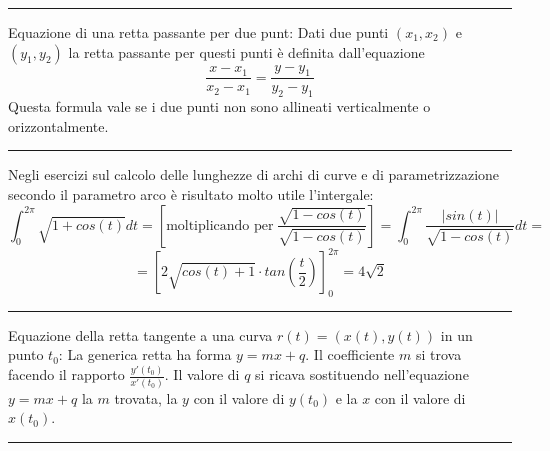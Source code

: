 \rule{\textwidth}{0,4pt}
Equazione di una retta passante per due punt:\newline
Dati due punti $(x_1, x_2)$ e $(y_1, y_2)$ la retta passante per questi punti è definita dall'equazione
\[
    \frac{x-x_1}{x_2-x_1} = \frac{y-y_1}{y_2-y_1}
\]
Questa formula vale se i due punti non sono allineati verticalmente o orizzontalmente.\newline
\rule{\textwidth}{0,4pt}\newline
Negli esercizi sul calcolo delle lunghezze di archi di curve e di parametrizzazione secondo il parametro arco è risultato molto utile l'intergale:
\[
    \int_{0}^{2\pi} \sqrt{1 + cos(t)}dt = \left[\text{moltiplicando per} \; \frac{\sqrt{1-cos(t)}}{\sqrt{1-cos(t)}}\right] = \int_{0}^{2\pi}\frac{|sin(t)|}{\sqrt{1-cos(t)}}dt =
\]
\[
    = [2 \sqrt{cos(t) +1}\cdot  tan(\frac{t}{2}) ]_0^{2\pi} = 4 \sqrt{2}
\]
\rule{\textwidth}{0,4pt}
Equazione della retta tangente a una curva $r(t) = (x(t), y(t))$ in un punto $t_0$:\newline
La generica retta ha forma $y = mx +q$. \newline
Il coefficiente $m$ si trova facendo il rapporto $\frac{y'(t_0)}{x'(t_0)}$.\newline
Il valore di $q$ si ricava sostituendo nell'equazione $y = mx +q$ la $m$ trovata, la $y$ con il valore di $y(t_0)$ e la $x$ con il valore di $x(t_0)$.\newline
\rule{\textwidth}{2pt}